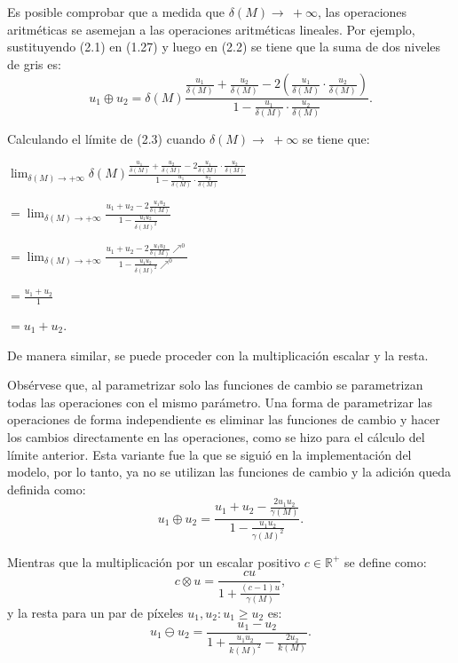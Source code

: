 Es posible comprobar que a medida que $\delta(M)\to\ +\infty$, las operaciones aritm\'eticas se asemejan a las operaciones aritm\'eticas lineales. Por ejemplo, sustituyendo (2.1) en (1.27) y luego en (2.2) se tiene que la suma de dos niveles de gris es:
\begin{equation}
	u_1\oplus u_2=\delta(M)\frac{\frac{u_1}{\delta(M)}+\frac{u_2}{\delta(M)}-2\left(\frac{u_1}{\delta(M)}\cdot\frac{u_2}{\delta(M)}\right)}{1-\frac{u_1}{\delta(M)}\cdot\frac{u_2}{\delta(M)}}.
\end{equation}

Calculando el l\'imite de (2.3) cuando $\delta(M)\to\ +\infty$ se tiene que:
\begin{center}
	$\displaystyle\lim_{\delta(M) \to +\infty}\delta(M)\frac{\frac{u_1}{\delta(M)}+\frac{u_2}{\delta(M)}-2\frac{u_1}{\delta(M)}\cdot\frac{u_2}{\delta(M)}}{1-\frac{u_1}{\delta(M)}\cdot\frac{u_2}{\delta(M)}}$
	
	$\displaystyle=\lim_{\delta(M) \to +\infty}\frac{u_1+u_2-2\frac{u_1u_2}{\delta(M)}}{1-\frac{u_1u_2}{\delta(M)^2}}$
	
	$\displaystyle=\lim_{\delta(M) \to +\infty}\frac{u_1+u_2-2\frac{u_1u_2}{\delta(M)}\nearrow^0}{1-\frac{u_1u_2}{\delta(M)^2}\nearrow^0}$
	
	$\displaystyle=\frac{u_1+u_2}{1}$
	
	$\displaystyle=u_1+u_2$.
\end{center}

De manera similar, se puede proceder con la multiplicaci\'on escalar y la resta.

Obs\'ervese que, al parametrizar solo las funciones de cambio se parametrizan todas las operaciones con el mismo par\'ametro. Una forma de parametrizar las operaciones de forma independiente es eliminar las funciones de cambio y hacer los cambios directamente en las operaciones, como se hizo para el c\'alculo del l\'imite anterior. Esta variante fue la que se sigui\'o en la implementaci\'on del modelo, por lo tanto, ya no se utilizan las funciones de cambio y la adici\'on queda definida como:
\begin{equation}
	u_1\oplus u_2=\frac{u_1+u_2-\frac{2u_1u_2}{\gamma(M)}}{1-\frac{u_1u_2}{\gamma(M)^2}}.
\end{equation}

Mientras que la multiplicaci\'on por un escalar positivo $c\in\mathbb{R}^+$ se define como:
\begin{equation}
	c\otimes u=\frac{cu}{1+\frac{(c-1)u}{\gamma(M)}},
\end{equation}
y la resta para un par de p\'ixeles $u_1,u_2:u_1\geq u_2$ es:
\begin{equation}
	u_1\ominus u_2=\frac{u_1-u_2}{1+\frac{u_1u_2}{k(M)^2}-\frac{2u_2}{k(M)}}.
\end{equation}

